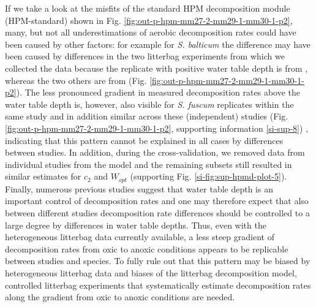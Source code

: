 \documentclass[esd, manuscript]{copernicus}
\begin{document}
If we take a look at the misfits of the standard HPM decomposition module (HPM-standard) shown in Fig. \ref{fig:out-p-hpm-mm27-2-mm29-1-mm30-1-p2}, many, but not all underestimations of aerobic decomposition rates could have been caused by other factors: for example for \emph{S. balticum} the difference may have been caused by differences in the two litterbag experiments from which we collected the data because the replicate with positive water table depth is from \citet{Strakova.2010}, whereas the two others are from \citet{Makila.2018} (Fig. \ref{fig:out-p-hpm-mm27-2-mm29-1-mm30-1-p2}). The less pronounced gradient in measured decomposition rates above the water table depth is, however, also visible for \emph{S. fuscum} replicates within the same study and in addition similar across these (independent) studies (Fig. \ref{fig:out-p-hpm-mm27-2-mm29-1-mm30-1-p2}, supporting information \ref{si-sup-8}) \citep{Johnson.1991, Golovatskaya.2017, Makila.2018}, indicating that this pattern cannot be explained in all cases by differences between studies. In addition, during the cross-validation, we removed data from individual studies from the model and the remaining subsets still resulted in similar estimates for \(c_2\) and \(W_{opt}\) (supporting Fig. \ref{si-fig:sup-hpmd-plot-5}). Finally, numerous previous studies suggest that water table depth is an important control of decomposition rates \citep[e.g.,][]{Blodau.2004} and one may therefore expect that also between different studies decomposition rate differences should be controlled to a large degree by differences in water table depths. Thus, even with the heterogeneous litterbag data currently available, a less steep gradient of decomposition rates from oxic to anoxic conditions appears to be replicable between studies and species. To fully rule out that this pattern may be biased by heterogeneous litterbag data and biases of the litterbag decomposition model, controlled litterbag experiments that systematically estimate decomposition rates along the gradient from oxic to anoxic conditions are needed.
\end{document}
